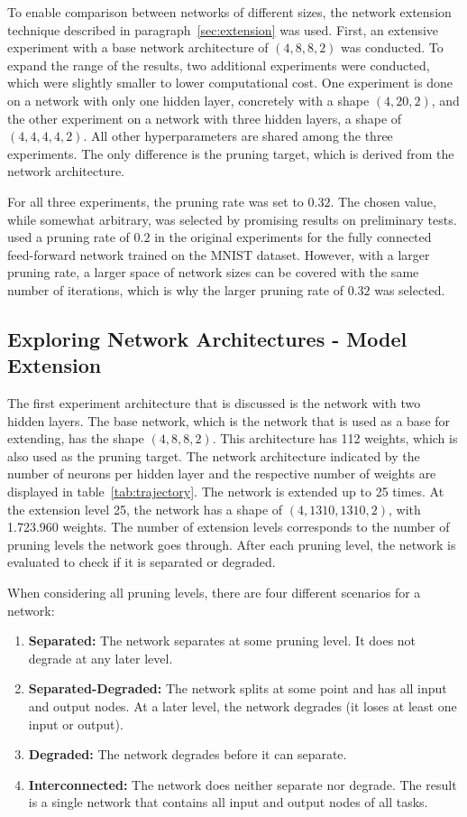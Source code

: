 To enable comparison between networks of different sizes, the network extension technique described in paragraph~\ref{sec:extension} was used.
First, an extensive experiment with a base network architecture of $(4,8,8,2)$ was conducted.
To expand the range of the results, two additional experiments were conducted, which were slightly smaller to lower computational cost.
One experiment is done on a network with only one hidden layer, concretely with a shape $(4,20,2)$, and the other experiment on a network with three hidden layers, a shape of $(4,4,4,4,2)$.
All other hyperparameters are shared among the three experiments.
The only difference is the pruning target, which is derived from the network architecture.

For all three experiments, the pruning rate was set to $0.32$.
The chosen value, while somewhat arbitrary, was selected by promising results on preliminary tests.
\textcite{LTH} used a pruning rate of $0.2$ in the original experiments for the fully connected feed-forward network trained on the MNIST dataset.
However, with a larger pruning rate, a larger space of network sizes can be covered with the same number of iterations, which is why the larger pruning rate of $0.32$ was selected.

\subsection{Exploring Network Architectures - Model Extension}\label{two-hidden}
The first experiment architecture that is discussed is the network with two hidden layers.
The base network, which is the network that is used as a base for extending, has the shape $(4,8,8,2)$.
This architecture has 112 weights, which is also used as the pruning target.
The network architecture indicated by the number of neurons per hidden layer and the respective number of weights are displayed in table~\ref{tab:trajectory}.
The network is extended up to 25 times.
At the extension level 25, the network has a shape of $(4,1310,1310,2)$, with 1.723.960 weights.
The number of extension levels corresponds to the number of pruning levels the network goes through.
After each pruning level, the network is evaluated to check if it is separated or degraded.

When considering all pruning levels, there are four different scenarios for a network:
\begin{enumerate}
\item \textbf{Separated:}
The network separates at some pruning level. 
It does not degrade at any later level. 
\item \textbf{Separated-Degraded:} 
The network splits at some point and has all input and output nodes.
At a later level, the network degrades (it loses at least one input or output).
\item \textbf{Degraded:} 
The network degrades before it can separate.
\item \textbf{Interconnected:} 
The network does neither separate nor degrade. 
The result is a single network that contains all input and output nodes of all tasks.
\end{enumerate}

